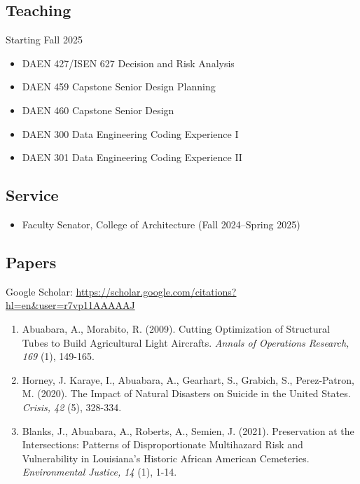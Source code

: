 \documentclass[11pt]{article}
\begin{document}
\subsection*{Teaching}
\vspace{-5pt}
{Starting Fall 2025}
\begin{itemize}[leftmargin=20pt]
\item DAEN 427/ISEN 627 Decision and Risk Analysis
\item DAEN 459 Capstone Senior Design Planning
\item DAEN 460 Capstone Senior Design
\item DAEN 300 Data Engineering Coding Experience I
\item DAEN 301 Data Engineering Coding Experience II
\end{itemize}

\subsection*{Service}
\begin{itemize}[leftmargin=20pt]
\item Faculty Senator, College of Architecture (Fall 2024--Spring 2025)
\end{itemize}

\subsection*{Papers}
\vspace{-5pt}
{Google Scholar: \url{https://scholar.google.com/citations?hl=en&user=r7vp11AAAAAJ}}
\begin{enumerate}[leftmargin=20pt]
\item Abuabara, A., Morabito, R. (2009). Cutting Optimization of Structural Tubes to Build Agricultural Light Aircrafts. \emph{Annals of Operations Research, 169} (1), 149-165.
\item Horney, J. Karaye, I., Abuabara, A., Gearhart, S., Grabich, S., Perez-Patron, M. (2020). The Impact of Natural Disasters on Suicide in the United States. \emph{Crisis, 42} (5), 328-334.
\item Blanks, J., Abuabara, A., Roberts, A., Semien, J. (2021). Preservation at the Intersections: Patterns of Disproportionate Multihazard Risk and Vulnerability in Louisiana's Historic African American Cemeteries. \emph{Environmental Justice, 14} (1), 1-14.
\end{enumerate}
\end{document}
